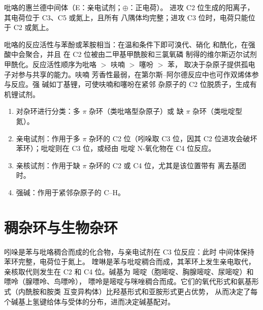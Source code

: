 \begin{omfigure}
{\small 吡咯的惠兰德中间体（E：亲电试剂；$\oplus$：正电荷）。
进攻 C2 位生成的阳离子，其电荷位于 C3、C5 或氮上，且所有
八隅体均完整；进攻 C3 位时，电荷只能位于 C2 或氮上。}
\end{omfigure}

吡咯的反应活性与苯酚或苯胺相当：在温和条件下即可溴代、硝化
和酰化，在强酸中会聚合，并且
在 C2 位被由二甲基甲酰胺和三氯氧磷
制得的维尔斯迈尔试剂甲酰化。反应活性顺序为吡咯 $>$ 呋喃 $>$ 噻吩 $>$ 苯，
取决于杂原子提供孤电子对参与共享的能力。呋喃
芳香性最弱，在第尔斯–阿尔德反应中也可作双烯体参与反应。强
碱如丁基锂，可使呋喃和噻吩在紧邻
杂原子的 C2 位脱质子，生成有机锂试剂。

\begin{method}[预测杂环上的进攻位点]\label{met:b3:heterocycles:site}
\begin{enumerate}
  \item 对杂环进行分类：多 $\pi$ 杂环（类吡咯型杂原子）或
        缺 $\pi$ 杂环（类吡啶型氮）。
  \item 亲电试剂：作用于多 $\pi$ 杂环的 C2 位（吲哚取 C3 位，因其
        C2 位进攻会破坏苯环）；吡啶则在 C3 位，或经由
        吡啶 N-氧化物在 C4 位反应。
  \item 亲核试剂：作用于缺 $\pi$ 杂环的 C2 或 C4 位，尤其是该位置带有
        离去基团时。
  \item 强碱：作用于紧邻杂原子的 C--H。
\end{enumerate}
\end{method}

\section{稠杂环与生物杂环}

吲哚是苯与吡咯稠合而成的化合物，与亲电试剂在 C3 位反应：此时
中间体保持苯环完整，电荷位于氮上。
喹啉是苯与吡啶稠合而成，其苯环上发生亲电取代，
亲核取代则发生在 C2 和 C4 位。碱基为
嘧啶（胞嘧啶、胸腺嘧啶、尿嘧啶）和嘌呤（腺嘌呤、鸟嘌呤），
嘌呤是嘧啶与咪唑稠合而成。它们的氧代形式和氨基形式（内酰胺和胺类
互变异构体）比羟基形式和亚胺形式更占优势，
从而决定了每个碱基上氢键给体与受体的分布，进而决定碱基配对。

